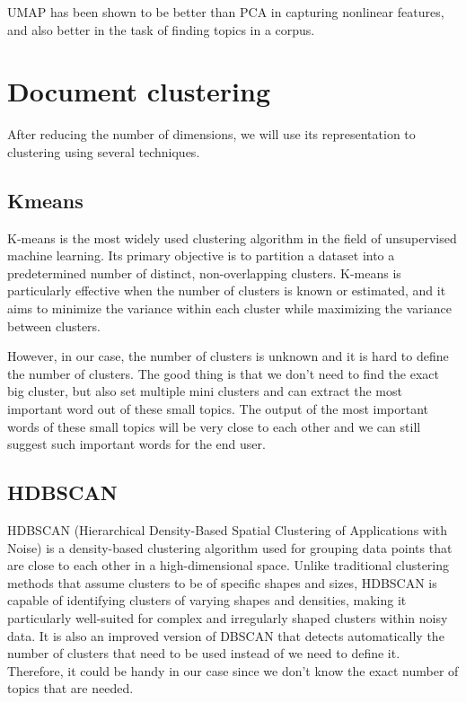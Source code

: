 UMAP has been shown to be better than PCA in capturing nonlinear features, and also better in the task of finding topics in a corpus.



\section{Document clustering}

After reducing the number of dimensions, we will use its representation to clustering using several techniques.

\subsection{Kmeans}

K-means is the most widely used clustering algorithm in the field of unsupervised machine learning. Its primary objective is to partition a dataset into a predetermined number of distinct, non-overlapping clusters. K-means is particularly effective when the number of clusters is known or estimated, and it aims to minimize the variance within each cluster while maximizing the variance between clusters.

However, in our case, the number of clusters is unknown and it is hard to define the number of clusters. The good thing is that we don't need to find the exact big cluster, but also set multiple mini clusters and can extract the most important word out of these small topics. The output of the most important words of these small topics will be very close to each other and we can still suggest such important words for the end user.

\subsection{HDBSCAN}

HDBSCAN\cite{mcinnes2017hdbscan} (Hierarchical Density-Based Spatial Clustering of Applications with Noise) is a density-based clustering algorithm used for grouping data points that are close to each other in a high-dimensional space. Unlike traditional clustering methods that assume clusters to be of specific shapes and sizes, HDBSCAN is capable of identifying clusters of varying shapes and densities, making it particularly well-suited for complex and irregularly shaped clusters within noisy data. It is also an improved version of DBSCAN that detects automatically the number of clusters that need to be used instead of we need to define it. Therefore, it could be handy in our case since we don't know the exact number of topics that are needed.

